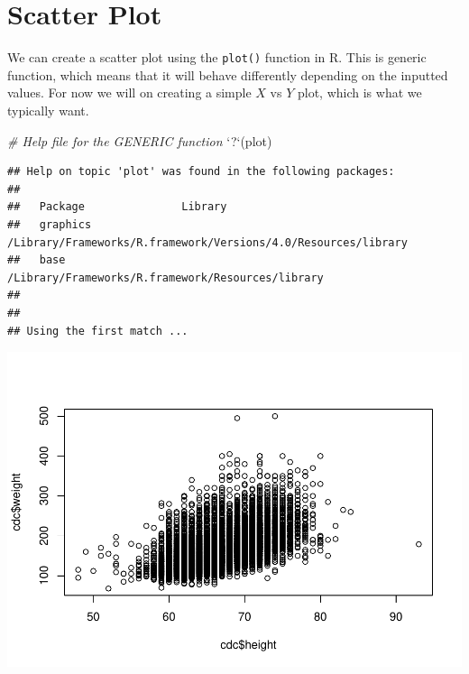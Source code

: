 \documentclass[
]{book}
\newenvironment{Shaded}{\begin{snugshade}}{\end{snugshade}}
\newcommand{\CommentTok}[1]{\textcolor[rgb]{0.56,0.35,0.01}{\textit{#1}}}
\newcommand{\DataTypeTok}[1]{\textcolor[rgb]{0.13,0.29,0.53}{#1}}
\newcommand{\KeywordTok}[1]{\textcolor[rgb]{0.13,0.29,0.53}{\textbf{#1}}}
\newcommand{\NormalTok}[1]{#1}
\newcommand{\OperatorTok}[1]{\textcolor[rgb]{0.81,0.36,0.00}{\textbf{#1}}}
\newcommand{\StringTok}[1]{\textcolor[rgb]{0.31,0.60,0.02}{#1}}
\begin{document}
\hypertarget{scatter-plot}{%
\section{Scatter Plot}\label{scatter-plot}}

We can create a scatter plot using the \texttt{plot()} function in R. This is generic function, which means that it will behave differently depending on the inputted values. For now we will on creating a simple \(X\) vs \(Y\) plot, which is what we typically want.

\begin{Shaded}
\begin{Highlighting}[]
\CommentTok{# Help file for the GENERIC function}
\StringTok{`}\DataTypeTok{?}\StringTok{`}\NormalTok{(plot)}
\end{Highlighting}
\end{Shaded}

\begin{verbatim}
## Help on topic 'plot' was found in the following packages:
## 
##   Package               Library
##   graphics              /Library/Frameworks/R.framework/Versions/4.0/Resources/library
##   base                  /Library/Frameworks/R.framework/Resources/library
## 
## 
## Using the first match ...
\end{verbatim}

\begin{Shaded}
\end{Shaded}

\includegraphics{_main_files/figure-latex/unnamed-chunk-176-1.pdf}
\end{document}
